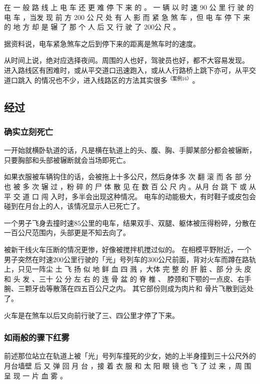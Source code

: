 \documentclass[UTF8]{ctexart}
\begin{document}
在 一 般 路 线 上 电 车 还 更 难 停 下 来 的 。
一 辆 以 时 速 $90$ 公 里 行 驶 的 电 车 ，当发 现 前 方 $200$ 公 尺 处 有 人 影 而 紧 急 煞 车 ，但 电 车 停 下 来 的 地 方 却 是 辗 了 那 个 人 后 又 行 驶 了 $200$公 尺 。

据资料说，电车紧急煞车之后到停下来的距离是煞车时的速度。

从时间上说，绝对应选择夜间。周围的人也好，驾驶员也好，都不大容易发现。 
进入路线区有困难时，或从平交道口迅速跑入，或从人行路桥上跳下亦可，从平交道口跳入 的情况也不少，进入线路区的方法其实很多$^{（案例 16）}$。

\subsection{经过}

\subsubsection*{确实立刻死亡}

一开始就横卧轨道的话，凡是横在轨道上的头、腹、胸、手脚某部分都会被辗断，只要胸部和头部被辗断就会当场即死亡。

如果衣服被车辆钩住的话，会被拖上十多公尺，然后身体多 次 翻 滚 而 各 部 分 也 被 多 次 辗 过 ，粉 碎 的 尸 体 散 见 在 数 百 公 尺 内 。从月 台 跳 下 或 从 平 交 道 口 闯 入时，多半会出现这种情况。 电车的动能极大，有时鞋子或皮包会碰到在月台上的人，该情况显示人已死亡了。

一个男子飞身去撞时速$85$公里的电车，结果双手、双腿、躯体被压得粉碎，分散在一百公尺范围内，头部更是不知去向了。

被新干线火车压断的情况更惨，好像被搅拌机搅过似的。
在相模平野附近，一个男子突然在时速$200$公里行驶的「光」号列车的$300$公尺前面，背对火车而蹲在路轨上，只见一阵尘 土 飞 扬 似 地 鲜 血 四 溅 ，大体 完 整 的 肝 脏 、部 分 头 皮 和 头 发 、三十 公 分 左 右 的 连 骨 盆 的 脊 椎 、 脖颈和下颚的一点皮、右手腕、三颗牙齿等散落在四五百公尺之内。
其它部份则成为肉片和 骨片飞散到远处了。

火车是在煞车以后又向前行驶了三、四公里才停了下来。 

\subsubsection*{如雨般的骤下红雾}

前述那位站立在轨道上被「光」号列车撞死的少女，她的上半身撞到三十公尺外的月台墙壁 后 又 弹 回 月 台 ，接 着 衣 服 和 太 阳 眼 镜 也 飞 了 过 来 ，周 围 呈 现 一 片 血 雾 。
\end{document}
